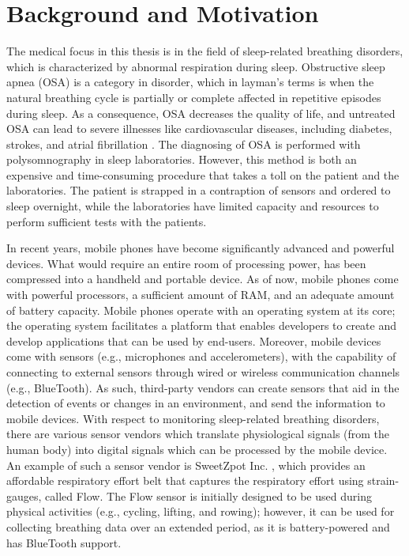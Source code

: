 \section{Background and Motivation}

The medical focus in this thesis is in the field of sleep-related breathing disorders, which is characterized by abnormal respiration during sleep. Obstructive sleep apnea (OSA) is a category in disorder, which in layman's terms is when the natural breathing cycle is partially or complete affected in repetitive episodes during sleep. As a consequence, OSA decreases the quality of life, and untreated OSA can lead to severe illnesses like cardiovascular diseases, including diabetes, strokes, and atrial fibrillation \cite{sleep_disorder}. The diagnosing of OSA is performed with polysomnography in sleep laboratories. However, this method is both an expensive and time-consuming procedure that takes a toll on the patient and the laboratories. The patient is strapped in a contraption of sensors and ordered to sleep overnight, while the laboratories have limited capacity and resources to perform sufficient tests with the patients.

In recent years, mobile phones have become significantly advanced and powerful devices. What would require an entire room of processing power, has been compressed into a handheld and portable device. As of now, mobile phones come with powerful processors, a sufficient amount of RAM, and an adequate amount of battery capacity. Mobile phones operate with an operating system at its core; the operating system facilitates a platform that enables developers to create and develop applications that can be used by end-users. Moreover, mobile devices come with sensors (e.g., microphones and accelerometers), with the capability of connecting to external sensors through wired or wireless communication channels (e.g., BlueTooth). As such, third-party vendors can create sensors that aid in the detection of events or changes in an environment, and send the information to mobile devices. With respect to monitoring sleep-related breathing disorders, there are various sensor vendors which translate physiological signals (from the human body) into digital signals which can be processed by the mobile device. An example of such a sensor vendor is SweetZpot Inc. \cite{flow}, which provides an affordable respiratory effort belt that captures the respiratory effort using strain-gauges, called Flow. The Flow sensor is initially designed to be used during physical activities (e.g., cycling, lifting, and rowing); however, it can be used for collecting breathing data over an extended period, as it is battery-powered and has BlueTooth support. 


